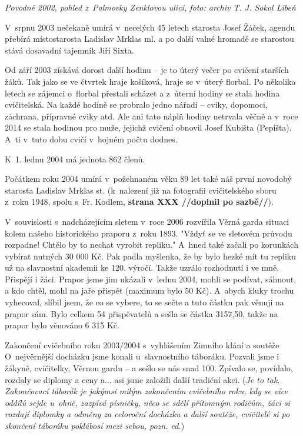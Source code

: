 \documentclass[a5paper, 12pt, twoside]{article}
\begin{document}

\textit{Povodně 2002, pohled z~Palmovky Zenklovou ulicí, foto: archiv T.
J. Sokol Libeň}

V~srpnu 2003 nečekaně umírá v~necelých 45 letech starosta Josef Žáček,
agendu přebírá místostarosta Ladislav Mrklas ml. a po další valné
hromadě se starostou stává dosavadní tajemník Jiří Sixta.

Od září 2003 získává dorost další hodinu -- je to úterý večer po cvičení
starších žáků. Tak jako se ve čtvrtek hraje košíková, hraje se v~úterý
florbal. Po několika letech se zájemci o~florbal přestali scházet a
z~úterní hodiny se stala hodina cvičitelská. Na každé hodině se probralo
jedno nářadí -- cviky, dopomoci, záchrana, přípravné cviky atd. Ale ani
tato náplň hodiny netrvala věčně a v~roce 2014 se stala hodinou pro
muže, jejichž cvičení obnovil Josef Kubišta (Pepišta). A~ti v~tuto dobu
cvičí v~hojném počtu dodnes.

K~1. lednu 2004 má jednota 862 členů.

Počátkem roku 2004 umírá v~požehnaném věku 89 let také náš první
novodobý starosta Ladislav Mrklas st. (k~nalezení již na fotografii
cvičitelského sboru z~roku 1948, spolu s~Fr. Kodlem, \textbf{strana XXX
//doplnil po sazbě//}).

V~souvislosti s~nadcházejícím sletem v~roce 2006 rozvířila Věrná garda
situaci kolem našeho historického praporu z~roku 1893. "Vždyť se ve
sletovém průvodu rozpadne! Chtělo by to nechat vyrobit repliku." A~hned
také začali po korunkách vybírat nutných 30 000 Kč. Pak padla myšlenka,
že by bylo hezké mít tu repliku už na slavnostní akademii ke 120.
výročí. Takže uzrálo rozhodnutí i ve mně. Přispějí i žáci. Prapor jsme
jim ukázali v~lednu 2004, mohli se podívat, sáhnout, a kdo chtěl, mohl
na jaře přispět (maximum bylo 50 Kč). A~abych kluky trochu vyhecoval,
slíbil jsem, že co se vybere, to se sečte a tuto částku pak věnuji na
prapor sám. Bylo celkem 54 přispěvatelů a sešla se částka 3157,50, takže
na prapor bylo věnováno 6 315 Kč.

Zakončení cvičebního roku 2003/2004 s~vyhlášením Zimního klání a soutěže
O~nejvěrnější docházku jsme konali u~slavnostního táboráku. Pozvali jsme
i žákyně, cvičitelky, Věrnou gardu -- a sešlo se nás snad 100. Zpívalo
se, povídalo, rozdaly se diplomy a ceny a... asi jsme založili další
tradiční akci. (\textit{Je to tak. Zakončovací táborák je jakýmsi milým
zakončením cvičebního roku, kdy se více oddílů sejde u~ohně, zazpívá
písničky, něco se sdělí přítomným rodičům, žáci si rozdají diplomky a
odměny za celoroční docházku a další soutěže, cvičitelé si po skončení
táboráku poklábosí mezi sebou, pozn. ed.})
\end{document}
